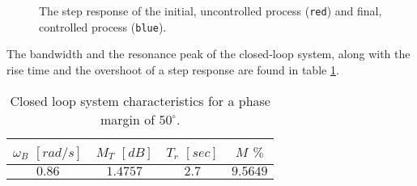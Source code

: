 \begin{figure}[H]\centering
  \scalebox{0.8}{}
  \caption{The step response of the initial, uncontrolled process
    (\texttt{red}) and final, controlled process (\texttt{blue}).}
  \label{fig:step_response_1.3}
\end{figure}

The bandwidth and the resonance peak of the closed-loop system, along with the
rise time and the overshoot of a step response are found in table \ref{tbl:ex1.3}.

\begin{table}[H] \centering
    \begin{tabular}{|c|c|c|c|} \hline
      $\omega_B$ $[rad/s]$ & $M_T$ $[dB]$ & $T_r$ $[sec]$ & $M$ $\%$  \\ \hline
      $0.86$               & $1.4757$     & $2.7$       & $9.5649$ \\ \hline
    \end{tabular}
    \caption{Closed loop system characteristics for a phase margin of
      $50^{\circ}$.}
    \label{tbl:ex1.3}
\end{table}
